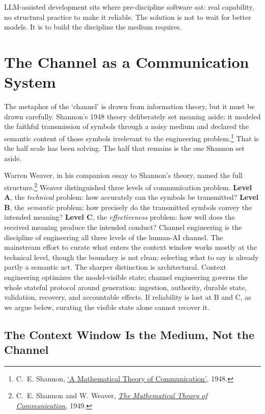 \documentclass[11pt, a4paper]{article}
\begin{document}
LLM-assisted development sits where pre-discipline software sat: real capability, no
structural practice to make it reliable. The solution is not to wait for better models. It
is to build the discipline the medium requires.


\section{The Channel as a Communication System}

The metaphor of the `channel' is drawn from information theory, but it must be drawn
carefully. Shannon's 1948 theory deliberately set meaning aside: it modeled the faithful
transmission of symbols through a noisy medium and declared the semantic content of those
symbols irrelevant to the engineering
problem.\footnote{C.~E. Shannon, \href{https://people.math.harvard.edu/~ctm/home/text/others/shannon/entropy/entropy.pdf}{`A Mathematical Theory of Communication'}, 1948.}
That is the half scale has been solving. The half that remains is the one Shannon set
aside.

Warren Weaver, in his companion essay to Shannon's theory, named the full
structure.\footnote{C.~E. Shannon and W. Weaver, \href{https://archive.org/details/mathematicaltheo00shan}{\textit{The Mathematical Theory of Communication}}, 1949.}
Weaver distinguished three levels of communication problem. \textbf{Level A}, the
\emph{technical} problem: how accurately can the symbols be transmitted? \textbf{Level
B}, the \emph{semantic} problem: how precisely do the transmitted symbols convey the
intended meaning? \textbf{Level C}, the \emph{effectiveness} problem: how well does the
received meaning produce the intended conduct? Channel engineering is the discipline of
engineering all three levels of the human-AI channel. The mainstream effort to curate
what enters the context window works mostly at the technical level, though the boundary
is not clean; selecting what to say is already partly a semantic act. The sharper
distinction is architectural. Context engineering optimizes the model-visible state;
channel engineering governs the whole stateful protocol around generation: ingestion,
authority, durable state, validation, recovery, and accountable effects. If reliability
is lost at B and C, as we argue below, curating the visible state alone cannot recover
it.

\subsection{The Context Window Is the Medium, Not the Channel}
\end{document}
